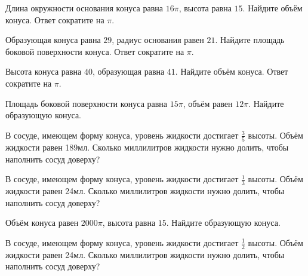 \documentclass[a4paper]{article}
\begin{document}
\begin{taskBN}{77}
Длина окружности основания конуса равна $16\pi$, высота равна $15$. Найдите объём конуса. Ответ сократите на $\pi$.
\end{taskBN}

\begin{taskBN}{78}
Образующая конуса равна $29$, радиус основания равен $21$. Найдите площадь боковой поверхности конуса. Ответ сократите на $\pi$.
\end{taskBN}

\begin{taskBN}{79}
Высота конуса равна $40$, образующая равна $41$. Найдите объём конуса. Ответ сократите на $\pi$.
\end{taskBN}

\begin{taskBN}{80}
Площадь боковой поверхности конуса равна $15\pi$, объём равен $12\pi$. Найдите образующую конуса. 
\end{taskBN}

\begin{taskBN}{81}
В сосуде, имеющем форму конуса, уровень жидкости достигает $\frac{3}{5}$ высоты. Объём жидкости равен 189мл. Сколько миллилитров жидкости нужно долить, чтобы наполнить сосуд доверху?
\end{taskBN}

\begin{taskBN}{82}
В сосуде, имеющем форму конуса, уровень жидкости достигает $\frac{1}{3}$ высоты. Объём жидкости равен 24мл. Сколько миллилитров жидкости нужно долить, чтобы наполнить сосуд доверху?
\end{taskBN}

\begin{taskBN}{83}
Объём конуса равен $2000\pi$, высота равна $15$. Найдите образующую конуса. 
\end{taskBN}

\begin{taskBN}{84}
В сосуде, имеющем форму конуса, уровень жидкости достигает $\frac{1}{2}$ высоты. Объём жидкости равен 24мл. Сколько миллилитров жидкости нужно долить, чтобы наполнить сосуд доверху?
\end{taskBN}
\end{document}

